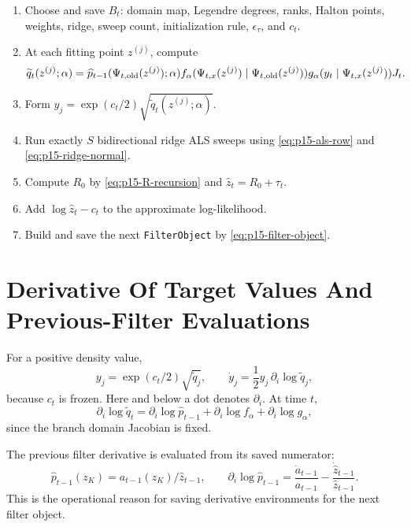 \documentclass[11pt]{article}
\theoremstyle{definition}
\theoremstyle{remark}
\renewcommand{\[}{\begin{equation}}
\renewcommand{\]}{\end{equation}}
\begin{document}
\begin{enumerate}[label=\textbf{F\arabic*.},leftmargin=*]
\item Choose and save \(B_t\): domain map, Legendre degrees, ranks, Halton
points, weights, ridge, sweep count, initialization rule, \(\epsilon_\tau\),
and \(c_t\).
\item At each fitting point \(z^{(j)}\), compute
\[
  \widetilde q_t(z^{(j)};\alpha)
  =
  \widehat p_{t-1}(\Psi_{t,{\rm old}}(z^{(j)});\alpha)
  f_\alpha(\Psi_{t,x}(z^{(j)})\mid \Psi_{t,{\rm old}}(z^{(j)}))
  g_\alpha(y_t\mid \Psi_{t,x}(z^{(j)}))
  J_t.
\]
\item Form \(y_j=\exp(c_t/2)\sqrt{\widetilde q_t(z^{(j)};\alpha)}\).
\item Run exactly \(S\) bidirectional ridge ALS sweeps using
\eqref{eq:p15-als-row} and \eqref{eq:p15-ridge-normal}.
\item Compute \(R_0\) by \eqref{eq:p15-R-recursion} and
\(\widehat z_t=R_0+\tau_t\).
\item Add \(\log\widehat z_t-c_t\) to the approximate log-likelihood.
\item Build and save the next \texttt{FilterObject} by
\eqref{eq:p15-filter-object}.
\end{enumerate}

\section{Derivative Of Target Values And Previous-Filter Evaluations}

For a positive density value,
\[
  y_j=\exp(c_t/2)\sqrt{\widetilde q_j},
  \qquad
  \dot y_j=\frac12 y_j\,\partial_i\log\widetilde q_j,
  \label{eq:p15-ydot}
\]
because \(c_t\) is frozen.  Here and below a dot denotes
\(\partial_i\).  At time \(t\),
\[
  \partial_i\log\widetilde q_t
  =
  \partial_i\log\widehat p_{t-1}
  +
  \partial_i\log f_\alpha
  +
  \partial_i\log g_\alpha,
  \label{eq:p15-logqdot}
\]
since the branch domain Jacobian is fixed.

The previous filter derivative is evaluated from its saved numerator:
\[
  \widehat p_{t-1}(z_K)=a_{t-1}(z_K)/\widehat z_{t-1},
  \qquad
  \partial_i\log\widehat p_{t-1}
  =
  \frac{\dot a_{t-1}}{a_{t-1}}
  -
  \frac{\dot{\widehat z}_{t-1}}{\widehat z_{t-1}}.
  \label{eq:p15-prev-filter-dot}
\]
This is the operational reason for saving derivative environments for the
next filter object.
\end{document}
